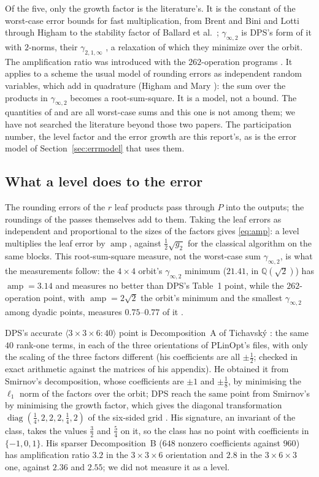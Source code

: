 \documentclass[11pt]{article}
\newcommand{\mm}[1]{\langle #1\rangle}
\newcommand{\ginf}{\gamma_{\infty,2}}
\newcommand{\amp}{\operatorname{amp}}
\begin{document}
Of the five, only the growth factor is the literature's.  It is the constant
of the worst-case error bounds for fast multiplication, from Brent
\cite{Brent70} and Bini and Lotti \cite{BL80} through Higham \cite{Higham02}
to the stability factor of Ballard et al.\ \cite{BBDLS16}; $\ginf$ is DPS's
form of it with $2$-norms, their $\gamma_{2,1,\infty}$
\cite[Eq.~(32)]{DPS24}, a relaxation of which they minimize over the orbit.
The amplification ratio was introduced with the $262$-operation programs
\cite{S26b}.  It applies to a scheme the usual model of rounding errors as
independent random variables, which add in quadrature (Higham and Mary
\cite{HM19}): the sum over the products in $\ginf$ becomes a root-sum-square.
It is a model, not a bound.  The quantities of \cite{DPS24} and
\cite{BBDLS16} are all worst-case sums and this one is not among them; we
have not searched the literature beyond those two papers.  The participation
number, the level factor and the error growth are this report's, as is the
error model of Section~\ref{sec:errmodel} that uses them.

\subsection{What a level does to the error}

The rounding errors of the $r$ leaf products pass through $P$ into the
outputs; the roundings of the passes themselves add to them.  Taking the leaf
errors as independent and proportional to the sizes of the factors gives
\eqref{eq:amp}: a level multiplies the leaf error by $\amp$, against
$\tfrac12\sqrt{g_2}$ for the classical algorithm on the same blocks.  This
root-sum-square measure, not the worst-case sum $\ginf$, is what the
measurements follow: the $4\times4$ orbit's $\ginf$ minimum ($21.41$, in
$\mathbb{Q}(\sqrt2)$) has $\amp=3.14$ and measures no better than DPS's
Table~1 point, while the $262$-operation point, with $\amp=2\sqrt2$ the
orbit's minimum and the smallest $\ginf$ among dyadic points, measures
$0.75$--$0.77$ of it \cite{S26b}.

DPS's accurate $\mm{3\times3\times6:40}$ point is Decomposition~A of
Tichavsk\'y \cite{Tichavsky21}: the same $40$ rank-one terms, in each of the
three orientations of PLinOpt's files, with only the scaling of the three
factors different (his coefficients are all $\pm\tfrac12$; checked in exact
arithmetic against the matrices of his appendix).  He obtained it from
Smirnov's decomposition, whose coefficients are $\pm1$ and $\pm\tfrac18$, by
minimising the $\ell_1$ norm of the factors over the orbit; DPS reach the
same point from Smirnov's by minimising the growth factor, which gives the
diagonal transformation $\operatorname{diag}(\tfrac14,2,2,2,\tfrac14,2)$ of
the six-sided grid \cite[Eq.~(97)]{DPS26b}.  His signature, an
invariant of the class, takes the values $\tfrac32$ and $\tfrac54$ on it, so
the class has no point with coefficients in $\{-1,0,1\}$.  His sparser
Decomposition~B ($648$ nonzero coefficients against $960$) has amplification
ratio $3.2$ in the $3\times3\times6$ orientation and $2.8$ in the
$3\times6\times3$ one, against $2.36$ and $2.55$; we did not measure it as a
level.
\end{document}
